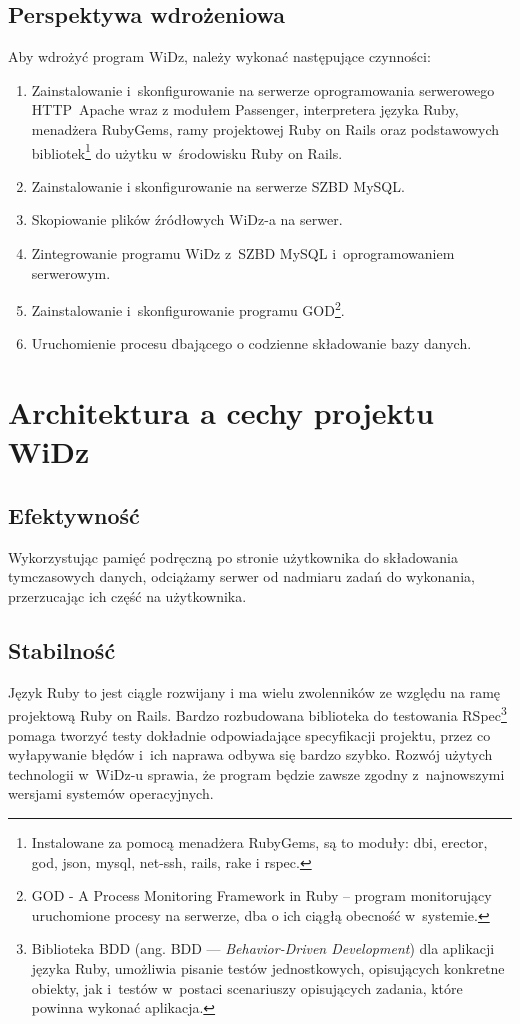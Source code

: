 \documentclass[12pt,leqno,twoside]{mwart}
\begin{document}
\subsection{Perspektywa wdrożeniowa}
\noindent Aby wdrożyć program WiDz, należy wykonać następujące czynności:
\begin{enumerate}
	\item Zainstalowanie i~skonfigurowanie na serwerze oprogramowania serwerowego \hbox{HTTP Apache} wraz z modułem Passenger, interpretera języka Ruby, menadżera RubyGems, ramy projektowej Ruby on Rails oraz podstawowych bibliotek\footnote{Instalowane za pomocą menadżera RubyGems, są to moduły: dbi, erector, god, json, mysql, net-ssh, rails, rake i rspec.} do użytku w~środowisku Ruby on Rails.
	\item Zainstalowanie i skonfigurowanie na serwerze SZBD MySQL.
	\item Skopiowanie plików źródłowych WiDz-a na serwer.
	\item Zintegrowanie programu WiDz z~SZBD MySQL i~oprogramowaniem serwerowym.
	\item Zainstalowanie i~skonfigurowanie programu GOD\footnote{GOD - A Process Monitoring Framework in Ruby -- program monitorujący uruchomione procesy na serwerze, dba o ich ciągłą obecność w~systemie.}.
	\item Uruchomienie procesu dbającego o codzienne składowanie bazy danych.
\end{enumerate}

\section{Architektura a cechy projektu WiDz}
\subsection{Efektywność}
\noindent Wykorzystując pamięć podręczną po stronie użytkownika do składowania tymczasowych danych, odciążamy serwer od nadmiaru zadań do wykonania, przerzucając ich część na użytkownika.
 
\subsection{Stabilność}
\noindent Język Ruby to jest ciągle rozwijany i ma wielu zwolenników ze względu na ramę projektową Ruby on Rails. Bardzo rozbudowana biblioteka do testowania RSpec\footnote{Biblioteka BDD (ang. BDD --- \textit{Behavior-Driven Development}) dla aplikacji języka Ruby, umożliwia pisanie testów jednostkowych, opisujących konkretne obiekty, jak i~testów w~postaci scenariuszy opisujących zadania, które powinna wykonać aplikacja.} pomaga tworzyć testy dokładnie odpowiadające specyfikacji projektu, przez co wyłapywanie błędów i~ich naprawa odbywa się bardzo szybko. Rozwój użytych technologii w~WiDz-u sprawia, że program będzie zawsze zgodny z~najnowszymi wersjami systemów operacyjnych.
\end{document}
